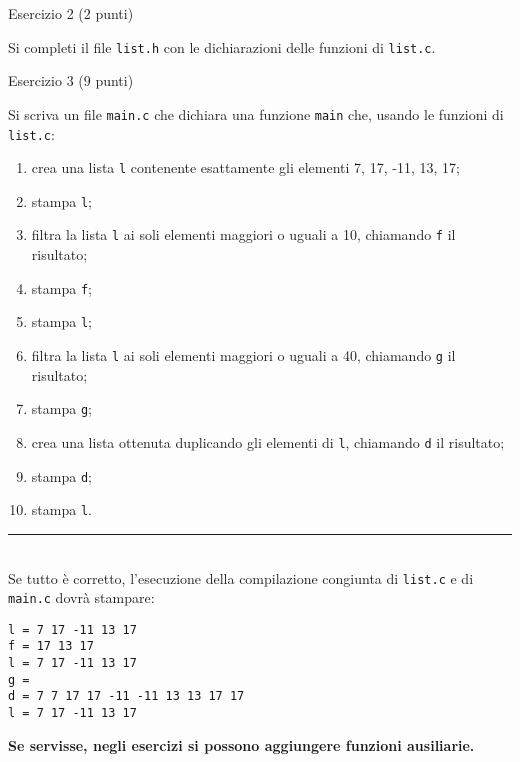 \documentclass[12pt]{article}
\begin{document}
\newpage
\begin{center}
  {\Large Esercizio 2} ($2$ punti)
\end{center}

Si completi il file \texttt{list.h} con le dichiarazioni delle funzioni
di \texttt{list.c}.

\vspace{2ex}
\begin{center}
  {\Large Esercizio 3} ($9$ punti)
\end{center}

Si scriva un file \texttt{main.c} che dichiara una funzione \texttt{main} che,
usando le funzioni di \texttt{list.c}:

\begin{enumerate}
\item crea una lista \texttt{l} contenente esattamente gli elementi
  7, 17, -11, 13, 17;
\item stampa \texttt{l};
\item filtra la lista \texttt{l} ai soli elementi maggiori o uguali a 10,
  chiamando \texttt{f} il risultato;
\item stampa \texttt{f};
\item stampa \texttt{l};
\item filtra la lista \texttt{l} ai soli elementi maggiori o uguali a 40,
  chiamando \texttt{g} il risultato;
\item stampa \texttt{g};
\item crea una lista ottenuta duplicando gli elementi di \texttt{l},
  chiamando \texttt{d} il risultato;
\item stampa \texttt{d};
\item stampa \texttt{l}.
\end{enumerate}

\hrule
\mbox{}\\

Se tutto \`e corretto, l'esecuzione della compilazione congiunta
di \texttt{list.c} e di \texttt{main.c} dovr\`a stampare:

\begin{mdframed}[backgroundcolor=lightgrey] 
\begin{verbatim}
l = 7 17 -11 13 17 
f = 17 13 17 
l = 7 17 -11 13 17 
g = 
d = 7 7 17 17 -11 -11 13 13 17 17 
l = 7 17 -11 13 17 
\end{verbatim}
\end{mdframed}

\begin{mdframed}[backgroundcolor=lightred] 
  \textbf{Se servisse, negli esercizi si possono aggiungere funzioni ausiliarie.}
\end{mdframed}
\end{document}
